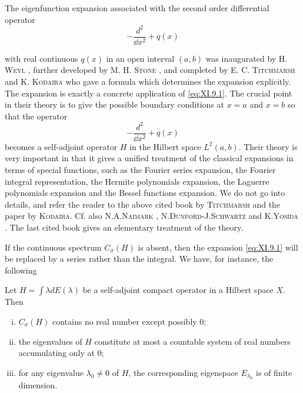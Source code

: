 \begin{remarku} The eigenfunction expansion associated with the second order differential operator 
\[
- \frac {d ^{2}}{\dd x ^{2}} + q (x)
\]
\end{remarku}

with real continuous $q(x)$ in an open interval $(a, b)$ was inaugurated by H. \textsc{Weyl} \cite{weyl337}, further developed by M. H. \textsc{Stone} \cite{stone311}, and completed by E. C. \textsc{Titchmarsh} \cite{titchmarsh324} and K. \textsc{Kodaira} \cite{kodaira151} who gave a formula which determines the expansion explicitly. The expansion is exactly a concrete application of \eqref{eq:XI.9.1}. The crucial point in their theory is to give the possible boundary conditions at $x = a$ and $x = b$ so that the operator 
\[
- \frac {d ^{2}}{\dd x ^{2}} + q (x)
\]
becomes a self-adjoint operator $H$ in the Hilbert space $L^{2}(a,b)$. Their theory is very important in that it gives a unified treatment of the classical expansions in terms of special functions, such as the Fourier series expansion, the Fourier integral representation, the Hermite polynomials expansion, the Laguerre polynomials expansion and the Bessel functions expansion. We do not go into details, and refer the reader to the above cited book by \textsc{Titchmarsh} and the paper by \textsc{Kodaira}. Cf. also N.A.\textsc{Naimark} \cite{naimark222}, N.\textsc{Dunford}-J.\textsc{Schwartz} \cite{dunford48} and K.\textsc{Yosida} \cite{yosida344}. The last cited book gives an elementary treatment of the theory. 

If the continuous spectrum $C_{\sigma}(H)$ is absent, then the expansion \eqref{eq:XI.9.1} will be replaced by a series rather than the integral. We have, for instance, the following 

\begin{theorem}\label{thm:XI.9.Theorem.1} Let $H = \int \lambda dE(\lambda)$ be a self-adjoint compact operator in a Hilbert space $X$. Then \begin{enumerate}[(i)]
\item $C_{\sigma}(H)$ contains no real number except possibly $0$;
\item the eigenvalues of $H$ constitute at most a countable system of real numbers accumulating only at $0$;
\item for any eigenvalue $\lambda_{0} \neq 0$ of $H$, the corresponding eigenspace $E_{\lambda_{0}}$ is of finite dimension.
\end{enumerate}
\end{theorem}

